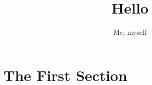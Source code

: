\documentclass{article}
\title{Hello}
\author{Me, myself}
\date{}
\begin{document}
\maketitle
\tableofcontents

\newpage
\section{The First Section}
\blindtext
\end{document}
